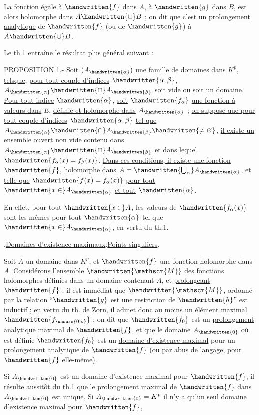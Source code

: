 La fonction égale à $\handwritten{f}$ dans $A$, à $\handwritten{g}$ dans $B$, est alors holomorphe dans $A\handwritten{\cup}B$ ; on dit que c'est un \uline{prolongement analytique} de $\handwritten{f}$ (ou de $\handwritten{g}$) à $A\handwritten{\cup}B$.

Le th.1 entraîne le résultat plus général suivant :

PROPOSITION 1.- \uline{Soit} $(A_{\handwritten{\alpha}})$ \uline{une famille de domaines dans} $K^p$, \uline{telsque}, \uline{pour tout couple d'indices} $\handwritten{\alpha,\beta}$, $A_{\handwritten{\alpha}}\handwritten{\cap}A_{\handwritten{\beta}}$ \uline{soit vide ou soit un domaine. Pour tout indice} $\handwritten{\alpha}$, \uline{soit} $\handwritten{f_\alpha}$ \uline{une fonction à valeurs dans} $E$, \uline{définie et holomorphe dans} $A_{\handwritten{\alpha}}$ ; \uline{on suppose que pour tout couple d'indices} $\handwritten{\alpha,\beta}$ \uline{tel que} $A_{\handwritten{\alpha}}\handwritten{\cap}A_{\handwritten{\beta}}\handwritten{\neq\varnothing}$, \uline{il existe un ensemble ouvert non vide contenu dans} $A_{\handwritten{\alpha}}\handwritten{\cap}A_{\handwritten{\beta}}$ \uline{et dans lequel} $\handwritten{f_\alpha(x)=f_\beta(x)}$. \uline{Dans ces conditions, il existe une.fonction} $\handwritten{f}$, \uline{holomorphe dans} $A=\handwritten{\bigcup_\alpha}A_{\handwritten{\alpha}}$, \uline{et telle que} $\handwritten{f(x)=f_\alpha(x)}$ \uline{pour tout} $\handwritten{x\in}A_{\handwritten{\alpha}}$ \uline{et tout} $\handwritten{\alpha}$.

En effet, pour tout $\handwritten{x\in}A$, les valeurs de $\handwritten{f_\alpha(x)}$ sont les mêmes pour tout $\handwritten{\alpha}$ tel que $\handwritten{x\in}A_{\handwritten{\alpha}}$, en vertu du th.1.

\uline{}.\quad \uline{Domaines d'existence ma\handwritten{-}ximaux}.\quad \uline{Points singuliers}.

Soit $A$ un domaine dans $K^p$, et $\handwritten{f}$ une fonction holomorphe dans $A$. Considérons l'ensemble $\handwritten{\mathscr{M}}$ des fonctions holomorphes définies dans un domaine contenant $A$, et \uline{prolongeant} $\handwritten{f}$ ; il est immédiat que $\handwritten{\mathscr{M}}$, ordonné par la relation ``$\handwritten{g}$ est une restriction de $\handwritten{h}$'' est \uline{inductif} ; en vertu du th. de Zorn, il admet donc au moins un élément maximal $\handwritten{f_{\unsure{0|o}}}$ ;  on dit que $\handwritten{f_{0}}$ est un \uline{prolongement analytique maximal} de $\handwritten{f}$, et que le domaine $A_{\handwritten{0}}$ où est définie $\handwritten{f_{0}}$ est un \uline{domaine d'existence maximal} pour un prolongement analytique de $\handwritten{f}$ (ou par abus de langage, pour $\handwritten{f}$ elle-même).

Si $A_{\handwritten{0}}$ est un domaine d'existence maximal pour $\handwritten{f}$, il résulte aussitôt du th.1 que le prolongement maximal de $\handwritten{f}$ dans $A_{\handwritten{0}}$ est \uline{unique}. Si $A_{\handwritten{0}}=K^p$ il n'y a qu'un seul domaine d'existence maximal pour $\handwritten{f}$,
